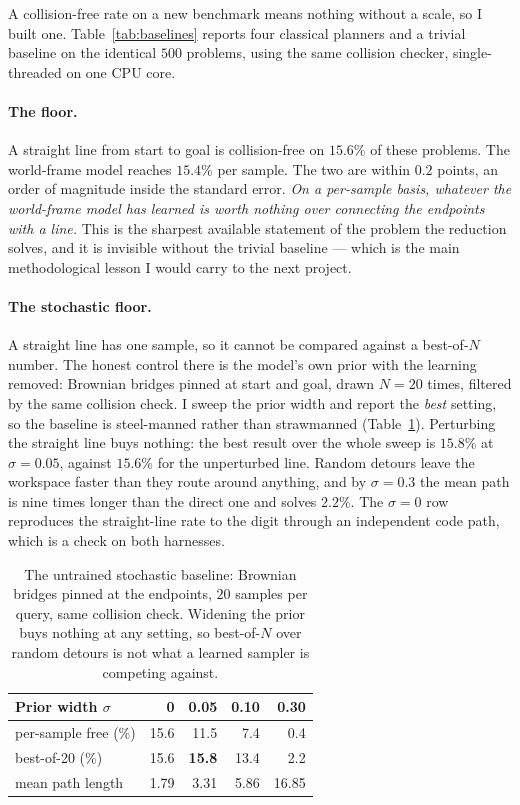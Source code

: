 \documentclass[11pt,a4paper]{article}
\newcommand{\toprule}{\hline}
\newcommand{\midrule}{\hline}
\newcommand{\bottomrule}{\hline}
\begin{document}
A collision-free rate on a new benchmark means nothing without a scale, so I
built one. Table~\ref{tab:baselines} reports four classical planners and a
trivial baseline on the identical $500$ problems, using the same collision
checker, single-threaded on one CPU core.

\paragraph{The floor.} A straight line from start to goal is collision-free on
$15.6\%$ of these problems. The world-frame model reaches $15.4\%$ per sample.
The two are within $0.2$ points, an order of magnitude inside the standard error.
\emph{On a per-sample basis, whatever the world-frame model has learned is worth
nothing over connecting the endpoints with a line.} This is the sharpest
available statement of the problem the reduction solves, and it is invisible
without the trivial baseline --- which is the main methodological lesson I would
carry to the next project.

\paragraph{The stochastic floor.} A straight line has one sample, so it cannot be
compared against a best-of-$N$ number. The honest control there is the model's own
prior with the learning removed: Brownian bridges pinned at start and goal, drawn
$N=20$ times, filtered by the same collision check. I sweep the prior width and
report the \emph{best} setting, so the baseline is steel-manned rather than
strawmanned (Table~\ref{tab:prior}). Perturbing the straight line buys nothing:
the best result over the whole sweep is $15.8\%$ at $\sigma = 0.05$, against
$15.6\%$ for the unperturbed line. Random detours leave the workspace faster than
they route around anything, and by $\sigma = 0.3$ the mean path is nine times
longer than the direct one and solves $2.2\%$. The $\sigma = 0$ row reproduces
the straight-line rate to the digit through an independent code path, which is a
check on both harnesses.

\begin{table}[t]
\centering
\begin{tabular}{lrrrr}
\toprule
Prior width $\sigma$ & 0 & 0.05 & 0.10 & 0.30 \\
\midrule
per-sample free (\%)  & 15.6 & 11.5 & 7.4 & 0.4 \\
best-of-20 (\%)       & 15.6 & \textbf{15.8} & 13.4 & 2.2 \\
mean path length      & 1.79 & 3.31 & 5.86 & 16.85 \\
\bottomrule
\end{tabular}
\caption{The untrained stochastic baseline: Brownian bridges pinned at the
endpoints, $20$ samples per query, same collision check. Widening the prior buys
nothing at any setting, so best-of-$N$ over random detours is not what a learned
sampler is competing against.}
\label{tab:prior}
\end{table}
\end{document}
